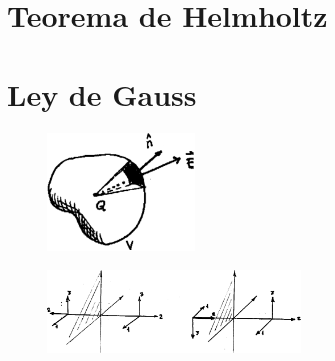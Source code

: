 \documentclass[10pt,oneside]{CBFT_book}
\begin{document}
\section{Teorema de Helmholtz}


\section{Ley de Gauss}

\begin{figure}[htb]
	\begin{center}
	\includegraphics[width=0.35\textwidth]{images/fig_ft1_gauss.pdf}	 
	\end{center}
	\caption{}
\end{figure} 


\begin{figure}[htb]
	\begin{center}
	\includegraphics[width=0.6\textwidth]{images/fig_ft1_reflexvect.pdf}	 
	\end{center}
	\caption{}
\end{figure} 

\end{document}
